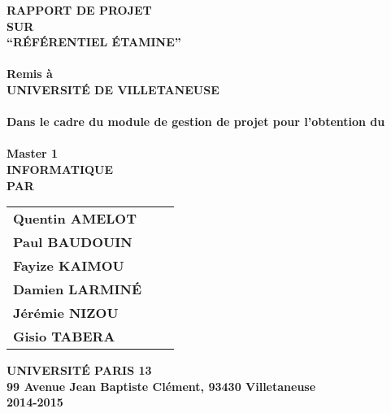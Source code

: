 \newpage
\begin{center}
\thispagestyle{empty}
\Large{\textbf{RAPPORT DE PROJET\\ \large{SUR}}}\\[0.7cm]
\LARGE{\textsc {\textbf{``RÉFÉRENTIEL ÉTAMINE''}}}\\[0.5cm]
\vspace{0.5cm}
\Large{\textbf{\\Remis à}}
\LARGE{\textbf{\\UNIVERSITÉ DE VILLETANEUSE\\}}
\vspace{1cm}
\Large{\textbf{\\Dans le cadre du module de gestion de projet pour l'obtention du\\}}
\Large{\textbf{\\Master 1\\INFORMATIQUE}}
\vspace{1cm}
\Large{\textbf{\\PAR}}\\[0.5cm]
\begin{table}[h]
\centering
\Large{
\begin{tabular}{>{\bfseries}lc>{\bfseries}r}
Quentin AMELOT\\Paul BAUDOUIN\\Fayize KAIMOU\\Damien LARMINÉ\\Jérémie NIZOU\\Gisio TABERA
\end{tabular}}
\end{table}
\vspace{2.5cm}
\Large{\textbf{UNIVERSITÉ PARIS 13}}\\
\large{\textbf{99 Avenue Jean Baptiste Clément, 93430 Villetaneuse}}
\large{\textbf{\\2014-2015}}\\
\vspace{1cm}
\newpage
\end{center}